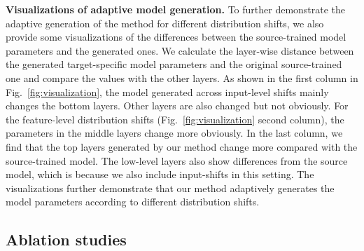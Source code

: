 \noindent
\textbf{Visualizations of adaptive model generation.} 
To further demonstrate the adaptive generation of the method for different distribution shifts, we also provide some visualizations of the differences between the source-trained model parameters and the generated ones. We calculate the layer-wise distance between the generated target-specific model parameters and the original source-trained one and compare the values with the other layers.
As shown in the first column in Fig.~\ref{fig:visualization}, the model generated across input-level shifts mainly changes the bottom layers. 
Other layers are also changed but not obviously.
For the feature-level distribution shifts (Fig.~\ref{fig:visualization} second column), the parameters in the middle layers change more obviously. 
In the last column, we find that the top layers generated by our method change more compared with the source-trained model. 
The low-level layers also show differences from the source model, which is because we also include input-shifts in this setting. 
The visualizations further demonstrate that our method adaptively generates the model parameters according to different distribution shifts.


\subsection{Ablation studies}
\label{sec: ablation}


\begin{table}[t]
\centering

\vspace{-2mm}
\caption{\textbf{Benefits of generating BN layers and classifiers} for ResNet-18 on \textit{PACS} and \textit{Office-Home}. Generating the parameters of both BN layers and classifiers improves the performance,  their combination achieves the best results. 
}
\label{tab:ab_fc}
\vspace{-6mm}
\end{table}

